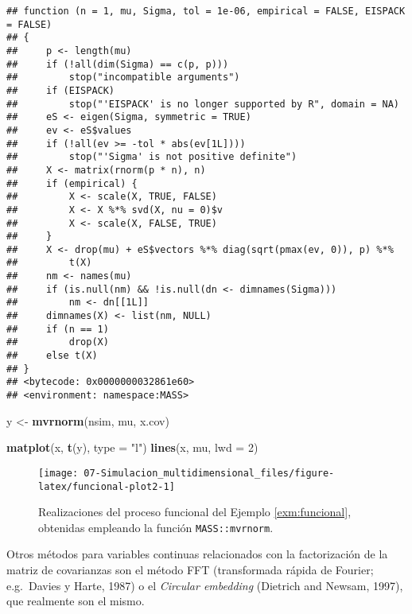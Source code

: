 \documentclass[
]{book}
\newenvironment{Shaded}{\begin{snugshade}}{\end{snugshade}}
\newcommand{\DataTypeTok}[1]{\textcolor[rgb]{0.13,0.29,0.53}{#1}}
\newcommand{\DecValTok}[1]{\textcolor[rgb]{0.00,0.00,0.81}{#1}}
\newcommand{\KeywordTok}[1]{\textcolor[rgb]{0.13,0.29,0.53}{\textbf{#1}}}
\newcommand{\NormalTok}[1]{#1}
\newcommand{\StringTok}[1]{\textcolor[rgb]{0.31,0.60,0.02}{#1}}
\theoremstyle{break}
\theoremstyle{definition}
\theoremstyle{definition}
\theoremstyle{definition}
\theoremstyle{remark}
\begin{document}
\begin{verbatim}
## function (n = 1, mu, Sigma, tol = 1e-06, empirical = FALSE, EISPACK = FALSE) 
## {
##     p <- length(mu)
##     if (!all(dim(Sigma) == c(p, p))) 
##         stop("incompatible arguments")
##     if (EISPACK) 
##         stop("'EISPACK' is no longer supported by R", domain = NA)
##     eS <- eigen(Sigma, symmetric = TRUE)
##     ev <- eS$values
##     if (!all(ev >= -tol * abs(ev[1L]))) 
##         stop("'Sigma' is not positive definite")
##     X <- matrix(rnorm(p * n), n)
##     if (empirical) {
##         X <- scale(X, TRUE, FALSE)
##         X <- X %*% svd(X, nu = 0)$v
##         X <- scale(X, FALSE, TRUE)
##     }
##     X <- drop(mu) + eS$vectors %*% diag(sqrt(pmax(ev, 0)), p) %*% 
##         t(X)
##     nm <- names(mu)
##     if (is.null(nm) && !is.null(dn <- dimnames(Sigma))) 
##         nm <- dn[[1L]]
##     dimnames(X) <- list(nm, NULL)
##     if (n == 1) 
##         drop(X)
##     else t(X)
## }
## <bytecode: 0x0000000032861e60>
## <environment: namespace:MASS>
\end{verbatim}

\begin{Shaded}
\begin{Highlighting}[]
\NormalTok{y <-}\StringTok{ }\KeywordTok{mvrnorm}\NormalTok{(nsim, mu, x.cov)}

\KeywordTok{matplot}\NormalTok{(x, }\KeywordTok{t}\NormalTok{(y), }\DataTypeTok{type =} \StringTok{"l"}\NormalTok{)}
\KeywordTok{lines}\NormalTok{(x, mu, }\DataTypeTok{lwd =} \DecValTok{2}\NormalTok{)}
\end{Highlighting}
\end{Shaded}

\begin{figure}[!htb]

{\centering \texttt{[image: 07-Simulacion\_multidimensional\_files/figure-latex/funcional-plot2-1]} 

}

\caption{Realizaciones del proceso funcional del Ejemplo \ref{exm:funcional}, obtenidas empleando la función \texttt{MASS::mvrnorm}.}\label{fig:funcional-plot2}
\end{figure}

Otros métodos para variables continuas relacionados con la factorización de la matriz de covarianzas son el método FFT (transformada rápida de Fourier; e.g.~Davies y Harte, 1987) o el \emph{Circular embedding} (Dietrich and Newsam, 1997), que realmente son el mismo.
\end{document}
